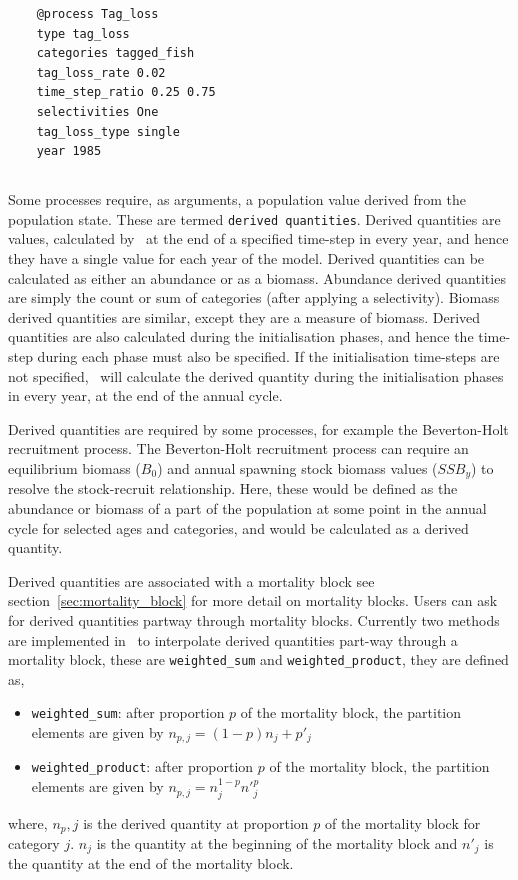 {\small{\begin{verbatim}
	@process Tag_loss
	type tag_loss
	categories tagged_fish
	tag_loss_rate 0.02
	time_step_ratio 0.25 0.75
	selectivities One
	tag_loss_type single
	year 1985
		\end{verbatim}}}

\subsection{\label{sec:derived-quantities}}

Some processes require, as arguments, a population value derived from the population state. These are termed \texttt{derived quantities}. Derived quantities are values, calculated by \CNAME\ at the end of a specified time-step in every year, and hence they have a single value for each year of the model. Derived quantities can be calculated as either an abundance or as a biomass. Abundance derived quantities are simply the count or sum of categories (after applying a selectivity). Biomass derived quantities are similar, except they are a measure of biomass. Derived quantities are also calculated during the initialisation phases, and hence the time-step during each phase must also be specified. If the initialisation time-steps are not specified, \CNAME\ will calculate the derived quantity during the initialisation phases in every year, at the end of the annual cycle. 

Derived quantities are required by some processes, for example the Beverton-Holt recruitment process. The Beverton-Holt recruitment process can require an equilibrium biomass ($B_0$) and annual spawning stock biomass values ($SSB_y$) to resolve the stock-recruit relationship. Here, these would be defined as the abundance or biomass of a part of the population at some point in the annual cycle for selected ages and categories, and would be calculated as a derived quantity.

Derived quantities are associated with a mortality block see section~\ref{sec:mortality_block} for more detail on mortality blocks. Users can ask for derived quantities partway through mortality blocks. Currently two methods are implemented in \CNAME\ to interpolate derived quantities part-way through a mortality block, these are \texttt{weighted\_sum} and \texttt{weighted\_product}, they are defined as,
\begin{itemize}
	\item \texttt{weighted\_sum}: after proportion $p$ of the mortality block, the partition elements are given by $n_{p,j} = (1 - p)n_j + p'_j$
	
	\item \texttt{weighted\_product}: after proportion $p$ of the mortality block, the partition elements are given by $n_{p,j} = n_j^{1-p} n'^p_j$
\end{itemize}
where, $n_p,j$ is the derived quantity at proportion $p$ of the mortality block for category $j$. $n_j$ is the quantity at the beginning of the mortality block and $n'_j$ is the quantity at the end of the mortality block.

